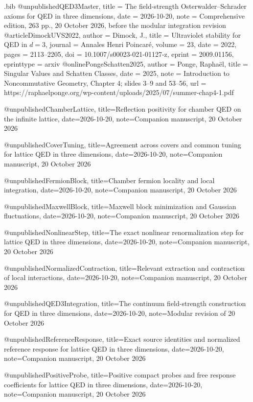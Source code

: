 \begin{filecontents*}[overwrite]{\jobname.bib}
@unpublished{QED3Master,
  title = {The field-strength {Osterwalder--Schrader} axioms for {QED} in three dimensions},
  date = {2026-10-20},
  note = {Comprehensive edition, 263 pp., 20 October 2026, before the modular integration revision}
}
@article{DimockUVS2022,
  author = {Dimock, J.},
  title = {Ultraviolet stability for {QED} in {$d=3$}},
  journal = {Annales Henri Poincar\'e},
  volume = {23},
  date = {2022},
  pages = {2113--2205},
  doi = {10.1007/s00023-021-01127-z},
  eprint = {2009.01156},
  eprinttype = {arxiv}
}
@online{PongeSchatten2025,
  author = {Ponge, Rapha\"el},
  title = {Singular Values and Schatten Classes},
  date = {2025},
  note = {Introduction to Noncommutative Geometry, Chapter 4; slides 3--9 and 53--56},
  url = {https://raphaelponge.org/wp-content/uploads/2025/07/summer-chap4-1.pdf}
}

@unpublished{ChamberLattice,
 title={Reflection positivity for chamber {QED} on the infinite lattice},
 date={2026-10-20}, note={Companion manuscript, 20 October 2026}}

@unpublished{CoverTuning,
 title={Agreement across covers and common tuning for lattice {QED} in three dimensions},
 date={2026-10-20}, note={Companion manuscript, 20 October 2026}}

@unpublished{FermionBlock,
 title={Chamber fermion locality and local integration},
 date={2026-10-20}, note={Companion manuscript, 20 October 2026}}

@unpublished{MaxwellBlock,
 title={Maxwell block minimization and Gaussian fluctuations},
 date={2026-10-20}, note={Companion manuscript, 20 October 2026}}

@unpublished{NonlinearStep,
 title={The exact nonlinear renormalization step for lattice {QED} in three dimensions},
 date={2026-10-20}, note={Companion manuscript, 20 October 2026}}

@unpublished{NormalizedContraction,
 title={Relevant extraction and contraction of local interactions},
 date={2026-10-20}, note={Companion manuscript, 20 October 2026}}

@unpublished{QED3Integration,
 title={The continuum field-strength construction for {QED} in three dimensions},
 date={2026-10-20}, note={Modular revision of 20 October 2026}}

@unpublished{ReferenceResponse,
 title={Exact source identities and normalized reference response for lattice {QED} in three dimensions},
 date={2026-10-20}, note={Companion manuscript, 20 October 2026}}

@unpublished{PositiveProbe,
 title={Positive compact probes and free response coefficients for lattice {QED} in three dimensions},
 date={2026-10-20}, note={Companion manuscript, 20 October 2026}}
\end{filecontents*}
\documentclass[11pt,letterpaper,reqno]{amsart}
\makeatletter
{}[2020/10/01]

